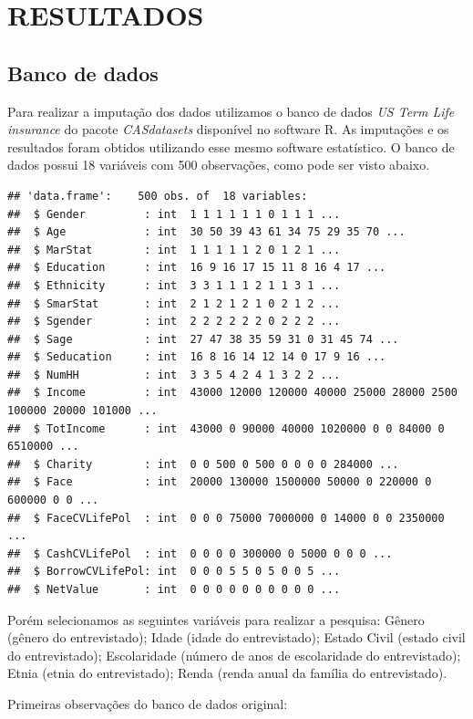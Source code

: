 \documentclass[]{article}
\begin{document}
\section{RESULTADOS}\label{resultados}

\subsection{Banco de dados}\label{banco-de-dados}

Para realizar a imputação dos dados utilizamos o banco de dados \emph{US
Term Life insurance} do pacote \emph{CASdatasets} disponível no software
R. As imputações e os resultados foram obtidos utilizando esse mesmo
software estatístico. O banco de dados possui 18 variáveis com 500
observações, como pode ser visto abaixo.

\begin{verbatim}
## 'data.frame':    500 obs. of  18 variables:
##  $ Gender         : int  1 1 1 1 1 1 0 1 1 1 ...
##  $ Age            : int  30 50 39 43 61 34 75 29 35 70 ...
##  $ MarStat        : int  1 1 1 1 1 2 0 1 2 1 ...
##  $ Education      : int  16 9 16 17 15 11 8 16 4 17 ...
##  $ Ethnicity      : int  3 3 1 1 1 2 1 1 3 1 ...
##  $ SmarStat       : int  2 1 2 1 2 1 0 2 1 2 ...
##  $ Sgender        : int  2 2 2 2 2 2 0 2 2 2 ...
##  $ Sage           : int  27 47 38 35 59 31 0 31 45 74 ...
##  $ Seducation     : int  16 8 16 14 12 14 0 17 9 16 ...
##  $ NumHH          : int  3 3 5 4 2 4 1 3 2 2 ...
##  $ Income         : int  43000 12000 120000 40000 25000 28000 2500 100000 20000 101000 ...
##  $ TotIncome      : int  43000 0 90000 40000 1020000 0 0 84000 0 6510000 ...
##  $ Charity        : int  0 0 500 0 500 0 0 0 0 284000 ...
##  $ Face           : int  20000 130000 1500000 50000 0 220000 0 600000 0 0 ...
##  $ FaceCVLifePol  : int  0 0 0 75000 7000000 0 14000 0 0 2350000 ...
##  $ CashCVLifePol  : int  0 0 0 0 300000 0 5000 0 0 0 ...
##  $ BorrowCVLifePol: int  0 0 0 5 5 0 5 0 0 5 ...
##  $ NetValue       : int  0 0 0 0 0 0 0 0 0 0 ...
\end{verbatim}

Porém selecionamos as seguintes variáveis para realizar a pesquisa:
Gênero (gênero do entrevistado); Idade (idade do entrevistado); Estado
Civil (estado civil do entrevistado); Escolaridade (número de anos de
escolaridade do entrevistado); Etnia (etnia do entrevistado); Renda
(renda anual da família do entrevistado).

Primeiras observações do banco de dados original:
\end{document}
